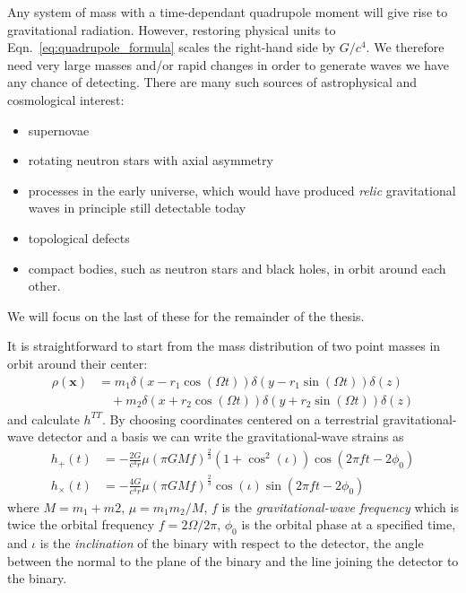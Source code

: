 Any system of mass with a time-dependant quadrupole moment will give
rise to gravitational radiation.  However, restoring physical units to
Eqn.~\ref{eq:quadrupole_formula} scales the right-hand side by
$G/c^4$.  We therefore need very large masses and/or rapid changes in
order to generate waves we have any chance of detecting.  There are
many such sources of astrophysical and cosmological interest:
%
\begin{itemize}
\item supernovae
\item rotating neutron stars with axial asymmetry
\item processes in the early universe, which would have produced
\emph{relic} gravitational waves in principle still detectable today
\item topological defects
\item compact bodies, such as neutron stars and black holes, in 
orbit around each other.
\end{itemize}
%
We will focus on the last of these for the remainder of the thesis.

It is straightforward to start from the mass distribution of two point
masses in orbit around their center:
%
\begin{align*}
\rho(\mathbf{x}) &= m_1\delta(x - r_1\cos(\Omega t)) \delta(y-r_1
\sin(\Omega t)) \delta(z) \\
&\quad + m_2\delta(x + r_2\cos(\Omega t)) \delta(y + r_2 \sin(\Omega t))
\delta(z)
\end{align*}
%
and calculate $h^{TT}$. By choosing coordinates centered on a
terrestrial gravitational-wave detector and a basis we can write
the gravitational-wave strains as~\cite{DBrownThesis}
%
\begin{align}
\label{eq:h_plus_cross}
h_+(t)   &= - \frac{2G}{c^4 r} \mu (\pi G M f)^{\frac{2}{3}}
(1+\cos^2(\iota)) \cos(2\pi f t - 2\phi_0) \\ \nonumber
h_\times(t)  &= - \frac{4G}{c^4 r} \mu (\pi G M f)^{\frac{2}{3}}
\cos(\iota) \sin(2\pi f t - 2\phi_0) \nonumber
\end{align}
%
where $M = m_1+m2$, $\mu = m_1 m_2 / M$, $f$ is the
\emph{gravitational-wave frequency} which is twice the orbital
frequency $f = 2\Omega/2\pi$, $\phi_0$ is the orbital phase at a
specified time, and $\iota$ is the \emph{inclination} of the binary
with respect to the detector, the angle between the normal to the
plane of the binary and the line joining the detector to the binary.

